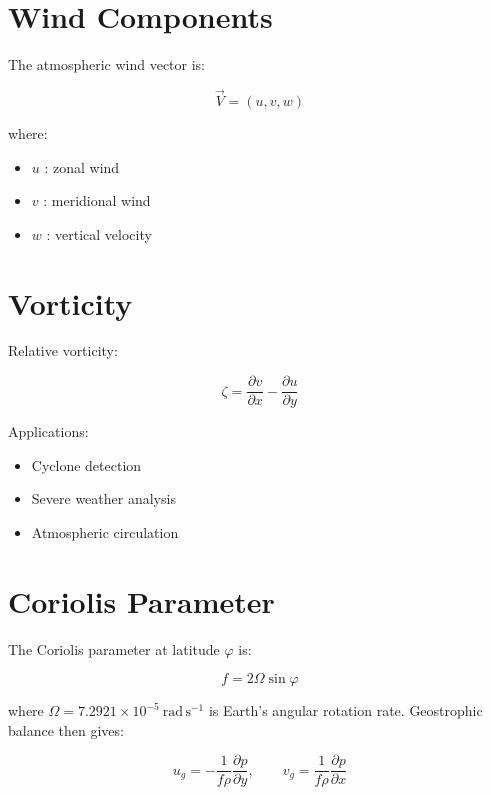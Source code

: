 \section{Wind Components}


The atmospheric wind vector is:


\[
\vec{V}=(u,v,w)
\]


where:

\begin{itemize}

\item $u$ : zonal wind

\item $v$ : meridional wind

\item $w$ : vertical velocity

\end{itemize}



\section{Vorticity}


Relative vorticity:

\begin{equation}
\zeta =
\frac{\partial v}{\partial x}
-
\frac{\partial u}{\partial y}
\end{equation}


Applications:

\begin{itemize}

\item Cyclone detection

\item Severe weather analysis

\item Atmospheric circulation

\end{itemize}



\section{Coriolis Parameter}


The Coriolis parameter at latitude $\varphi$ is:

\begin{equation}
f = 2\Omega\sin\varphi
\end{equation}


where $\Omega = 7.2921 \times 10^{-5}~\mathrm{rad\,s^{-1}}$ is Earth's
angular rotation rate. Geostrophic balance then gives:

\begin{equation}
u_g = -\frac{1}{f\rho}\frac{\partial p}{\partial y},
\qquad
v_g = \frac{1}{f\rho}\frac{\partial p}{\partial x}
\end{equation}
